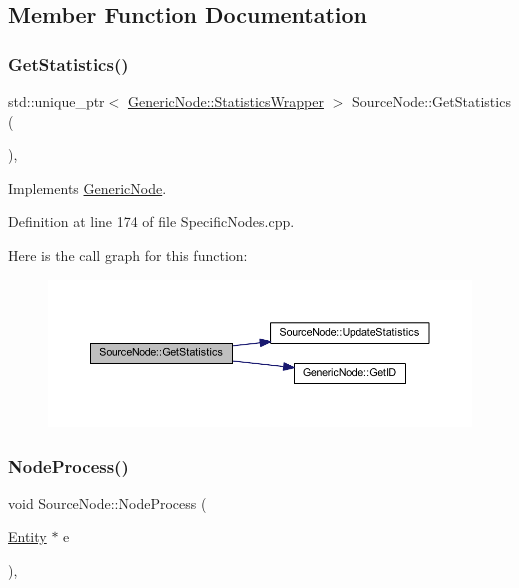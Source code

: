 \subsection{Member Function Documentation}
\mbox{\label{class_source_node_a0aea882fe808d9da6d506653be166e73}} 
\subsubsection{\texorpdfstring{Get\+Statistics()}{GetStatistics()}}
{\footnotesize\ttfamily std\+::unique\+\_\+ptr$<$ \hyperlink{class_generic_node_1_1_statistics_wrapper}{Generic\+Node\+::\+Statistics\+Wrapper} $>$ Source\+Node\+::\+Get\+Statistics (\begin{DoxyParamCaption}{ }\end{DoxyParamCaption})\hspace{0.3cm}{\ttfamily [override]}, {\ttfamily [virtual]}}



Implements \hyperlink{class_generic_node_ae7c8424c8c14fd3de993c902d78deb67}{Generic\+Node}.



Definition at line 174 of file Specific\+Nodes.\+cpp.

Here is the call graph for this function\+:
\nopagebreak
\begin{figure}[H]
\begin{center}
\leavevmode
\includegraphics[width=350pt]{class_source_node_a0aea882fe808d9da6d506653be166e73_cgraph}
\end{center}
\end{figure}
\mbox{\label{class_source_node_a666a65bd2424a8f56d8f08260c09c0b4}} 
\subsubsection{\texorpdfstring{Node\+Process()}{NodeProcess()}}
{\footnotesize\ttfamily void Source\+Node\+::\+Node\+Process (\begin{DoxyParamCaption}\item[{\hyperlink{class_entity}{Entity} $\ast$}]{e }\end{DoxyParamCaption})\hspace{0.3cm}{\ttfamily [override]}, {\ttfamily [virtual]}}



